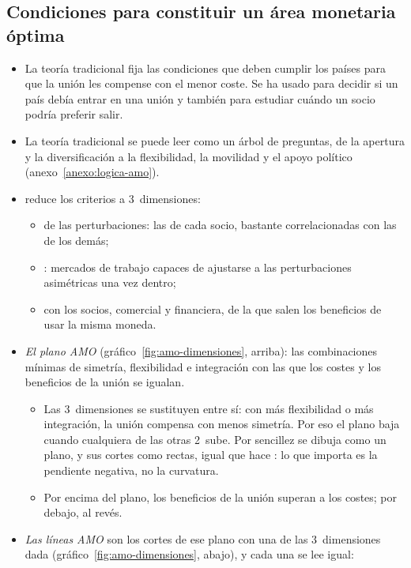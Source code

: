 \documentclass[11pt]{article}
\begin{document}
\subsection{Condiciones para constituir un área monetaria óptima}\label{sec:condiciones}

\begin{itemize}
\item La teoría tradicional fija las condiciones que deben cumplir los países para que la unión les compense con el menor coste. Se ha usado para decidir si un país debía entrar en una unión y también para estudiar cuándo un socio podría preferir salir.
\item La teoría tradicional se puede leer como un árbol de preguntas, de la apertura y la diversificación a la flexibilidad, la movilidad y el apoyo político (anexo~\ref{anexo:logica-amo}).
\item \textcite{DeGrauwe2022Economics} reduce los criterios a 3~dimensiones:
  \begin{itemize}
  \item {} de las perturbaciones: las de cada socio, bastante correlacionadas con las de los demás;
  \item {}: mercados de trabajo capaces de ajustarse a las perturbaciones asimétricas una vez dentro;
  \item {} con los socios, comercial y financiera, de la que salen los beneficios de usar la misma moneda.
  \end{itemize}
\item \emph{El plano AMO} (gráfico~\ref{fig:amo-dimensiones}, arriba): las combinaciones mínimas de simetría, flexibilidad e integración con las que los costes y los beneficios de la unión se igualan.
  \begin{itemize}
  \item Las 3~dimensiones se sustituyen entre sí: con más flexibilidad o más integración, la unión compensa con menos simetría. Por eso el plano baja cuando cualquiera de las otras 2~sube. Por sencillez se dibuja como un plano, y sus cortes como rectas, igual que hace : lo que importa es la pendiente negativa, no la curvatura.
  \item Por encima del plano, los beneficios de la unión superan a los costes; por debajo, al revés.
  \end{itemize}
\item \emph{Las líneas AMO} son los cortes de ese plano con una de las 3~dimensiones dada (gráfico~\ref{fig:amo-dimensiones}, abajo), y cada una se lee igual:

\end{itemize}
\end{document}
